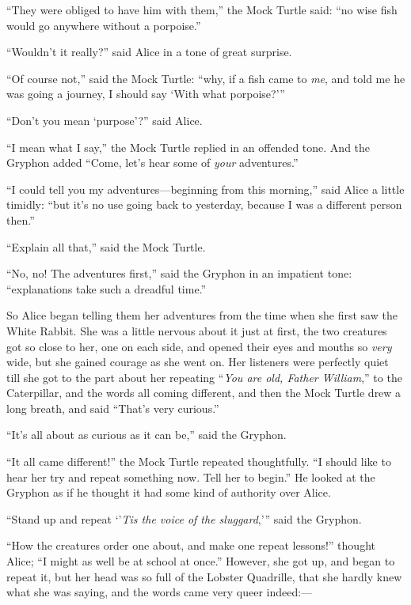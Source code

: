 \documentclass[11pt,openany,oneside]{book}
\begin{document}
“They were obliged to have him with them,” the Mock Turtle said: “no wise fish would go anywhere without a porpoise.” 

“Wouldn’t it really?” said Alice in a tone of great surprise. 

“Of course not,” said the Mock Turtle: “why, if a fish came to {\em me\/}, and told me he was going a journey, I should say ‘With what porpoise?’” 

“Don’t you mean ‘purpose’?” said Alice. 

“I mean what I say,” the Mock Turtle replied in an offended tone. And the Gryphon added “Come, let’s hear some of {\em your\/} adventures.” 

“I could tell you my adventures—beginning from this morning,” said Alice a little timidly: “but it’s no use going back to yesterday, because I was a different person then.” 

“Explain all that,” said the Mock Turtle. 

“No, no! The adventures first,” said the Gryphon in an impatient tone: “explanations take such a dreadful time.” 

So Alice began telling them her adventures from the time when she first saw the White Rabbit. She was a little nervous about it just at first, the two creatures got so close to her, one on each side, and opened their eyes and mouths so {\em very\/} wide, but she gained courage as she went on. Her listeners were perfectly quiet till she got to the part about her repeating “{\em You are old, Father William\/},” to the Caterpillar, and the words all coming different, and then the Mock Turtle drew a long breath, and said “That’s very curious.” 

“It’s all about as curious as it can be,” said the Gryphon. 

“It all came different!” the Mock Turtle repeated thoughtfully. “I should like to hear her try and repeat something now. Tell her to begin.” He looked at the Gryphon as if he thought it had some kind of authority over Alice. 

“Stand up and repeat ‘’{\em Tis the voice of the sluggard\/},’” said the Gryphon. 

“How the creatures order one about, and make one repeat lessons!” thought Alice; “I might as well be at school at once.” However, she got up, and began to repeat it, but her head was so full of the Lobster Quadrille, that she hardly knew what she was saying, and the words came very queer indeed:— 
\end{document}
